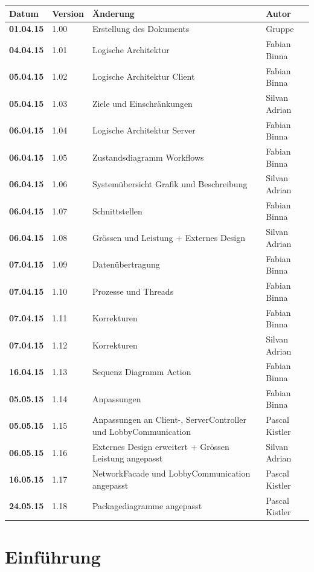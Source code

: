 \documentclass[11pt]{scrartcl}
\begin{document}
\begin{tabularx}{\linewidth}{l l X l}
\textbf{Datum} & \textbf{Version} & \textbf{Änderung}  & \textbf{Autor} \\
\hline
\textbf{01.04.15} & 1.00 & Erstellung des Dokuments & Gruppe \\
\textbf{04.04.15} & 1.01 & Logische Architektur & Fabian Binna \\
\textbf{05.04.15} & 1.02 & Logische Architektur Client & Fabian Binna\\
\textbf{05.04.15} & 1.03 & Ziele und Einschränkungen & Silvan Adrian\\
\textbf{06.04.15} & 1.04 & Logische Architektur Server & Fabian Binna\\
\textbf{06.04.15} & 1.05 & Zustandsdiagramm Workflows & Fabian Binna\\
\textbf{06.04.15} & 1.06 & Systemübersicht Grafik und Beschreibung & Silvan Adrian\\
\textbf{06.04.15} & 1.07 & Schnittstellen & Fabian Binna\\
\textbf{06.04.15} & 1.08 & Grössen und Leistung + Externes Design & Silvan Adrian\\
\textbf{07.04.15} & 1.09 & Datenübertragung & Fabian Binna\\
\textbf{07.04.15} & 1.10 & Prozesse und Threads & Fabian Binna\\
\textbf{07.04.15} & 1.11 & Korrekturen & Fabian Binna\\
\textbf{07.04.15} & 1.12 & Korrekturen & Silvan Adrian\\
\textbf{16.04.15} & 1.13 & Sequenz Diagramm Action & Fabian Binna\\
\textbf{05.05.15} & 1.14 & Anpassungen & Fabian Binna\\
\bf{05.05.15} & 1.15 & Anpassungen an Client-, ServerController und LobbyCommunication 
& Pascal Kistler\\
\bf{06.05.15} & 1.16 & Externes Design erweitert + Grössen Leistung angepasst & Silvan Adrian\\
\bf{16.05.15} & 1.17 & NetworkFacade und LobbyCommunication angepasst & Pascal Kistler\\
\bf{24.05.15} & 1.18 & Packagediagramme angepasst & Pascal Kistler\\
\end{tabularx}

\newpage
\tableofcontents
\newpage

\section{Einführung}
\end{document}
